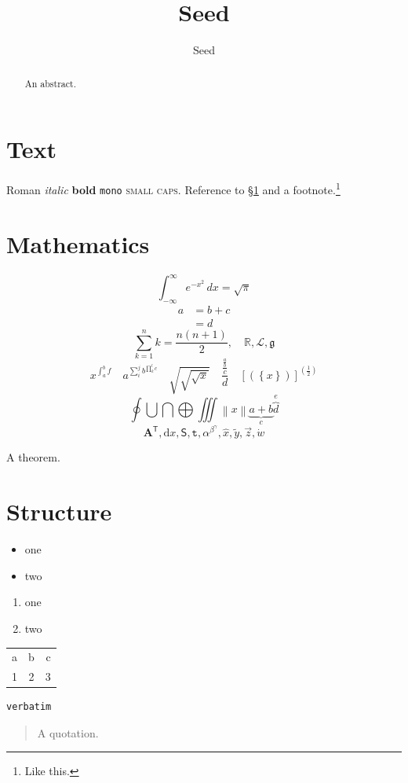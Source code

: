 \documentclass[11pt]{article}
\title{Seed}\author{Seed}
\begin{document}
\maketitle
\tableofcontents
\section{Text}\label{sec:text}
Roman \textit{italic} \textbf{bold} \texttt{mono} \textsc{small caps}.
Reference to \S\ref{sec:text} and a footnote.\footnote{Like this.}
\begin{abstract}An abstract.\end{abstract}
\section{Mathematics}
\begin{equation}\int_{-\infty}^{\infty}e^{-x^2}\,dx=\sqrt{\pi}\end{equation}
\begin{align} a &= b + c \\ &= d \end{align}
\[ \sum_{k=1}^{n} k = \frac{n(n+1)}{2}, \quad \mathbb{R}, \mathcal{L}, \mathfrak{g} \]
\[ x^{\int_{a}^{b} f} \quad
   a^{\sum_{i}^{j} b^{\prod_{k}^{l} c}} \quad
   \sqrt{\sqrt{\sqrt{x}}} \quad
   \frac{\frac{\frac{a}{b}}{c}}{d} \quad
   \left[\left(\left\{x\right\}\right)\right]^{\left(\frac{1}{2}\right)} \]
\[ \oint \bigcup \bigcap \bigoplus \iiint \left\| x \right\|
   \underbrace{a+b}_{c} \overbrace{d}^{e} \]
\[ \mathbf{A}^{\mathsf{T}}, \mathrm{d}x, \mathsf{S}, \mathtt{t},
   \alpha^{\beta^{\gamma}}, \hat{x}, \tilde{y}, \vec{z}, \dot{w} \]
\begin{theorem}A theorem.\end{theorem}
\section{Structure}
\begin{itemize}\item one \item two\end{itemize}
\begin{enumerate}\item one \item two\end{enumerate}
\begin{tabular}{lcr}a & b & c\\ 1 & 2 & 3\end{tabular}
\begin{verbatim}verbatim\end{verbatim}
\begin{quote}A quotation.\end{quote}
\end{document}
